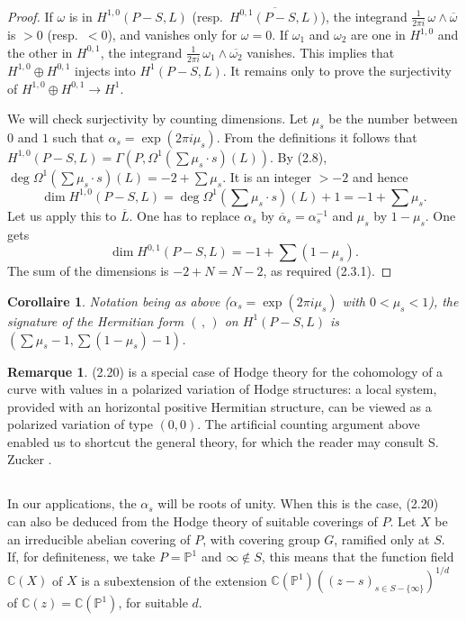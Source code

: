 \documentclass[12pt,a4paper]{article}
\theoremstyle{plain}
\newtheorem{corollary}[theorem]{Corollaire}
\theoremstyle{definition}
\newtheorem{remark}[theorem]{Remarque}
\theoremstyle{remark}
\newcommand{\CC}{\mathbb{C}}
\newcommand{\PP}{\mathbb{P}}
\numberwithin{equation}{section}
\providecommand{\CC}{\mathbb{C}}
\providecommand{\PP}{\mathbb{P}}
\begin{document}
\begin{proof}
If $\omega$ is in $H^{1,0}(P-S, L)$ (resp.\ $\overline{H^{0,1}(P-S, L)}$), the integrand $\frac{1}{2\pi i} \, \omega \wedge \overline{\omega}$ is $> 0$ (resp.\ $< 0$), and vanishes only for $\omega = 0$. If $\omega_1$ and $\omega_2$ are one in $H^{1,0}$ and the other in $H^{0,1}$, the integrand $\frac{1}{2\pi i} \, \omega_1 \wedge \overline{\omega_2}$ vanishes. This implies that $H^{1,0} \oplus H^{0,1}$ injects into $H^1(P-S, L)$. It remains only to prove the surjectivity of $H^{1,0} \oplus H^{0,1} \to H^1$.

We will check surjectivity by counting dimensions. Let $\mu_s$ be the number between $0$ and $1$ such that $\alpha_s = \exp(2\pi i \mu_s)$. From the definitions it follows that $H^{1,0}(P-S, L) = \Gamma(P, \Omega^1(\sum \mu_s \cdot s)(L))$. By (2.8), $\deg \Omega^1(\sum \mu_s \cdot s)(L) = -2 + \sum \mu_s$. It is an integer $> -2$ and hence
\begin{equation}\label{eq:2.20.1}
\dim H^{1,0}(P-S, L) = \deg \Omega^1(\sum \mu_s \cdot s)(L) + 1 = -1 + \sum \mu_s.
\end{equation}
Let us apply this to $\overline{L}$. One has to replace $\alpha_s$ by $\overline{\alpha}_s = \alpha_s^{-1}$ and $\mu_s$ by $1-\mu_s$. One gets
\begin{equation}\label{eq:2.20.2}
\dim H^{0,1}(P-S, L) = -1 + \sum (1-\mu_s).
\end{equation}
The sum of the dimensions is $-2 + N = N-2$, as required (2.3.1).
\end{proof}

\begin{corollary}\label{cor:2.21}
Notation being as above ($\alpha_s = \exp(2\pi i \mu_s)$ with $0 < \mu_s < 1$), the signature of the Hermitian form $(\,,\,)$ on $H^1(P-S, L)$ is $(\sum \mu_s - 1, \sum(1-\mu_s) - 1)$.
\end{corollary}

\begin{remark}\label{rmk:2.22}
(2.20) is a special case of Hodge theory for the cohomology of a curve with values in a polarized variation of Hodge structures: a local system, provided with an horizontal positive Hermitian structure, can be viewed as a polarized variation of type $(0,0)$. The artificial counting argument above enabled us to shortcut the general theory, for which the reader may consult S. Zucker \cite{Zucker}.
\end{remark}

\subsection{}
In our applications, the $\alpha_s$ will be roots of unity. When this is the case, (2.20) can also be deduced from the Hodge theory of suitable coverings of $P$. Let $X$ be an irreducible abelian covering of $P$, with covering group $G$, ramified only at $S$. If, for definiteness, we take $P = \PP^1$ and $\infty \notin S$, this means that the function field $\CC(X)$ of $X$ is a subextension of the extension $\CC(\PP^1)((z-s)_{s \in S - \{\infty\}})^{1/d}$ of $\CC(z) = \CC(\PP^1)$, for suitable $d$.
\end{document}
